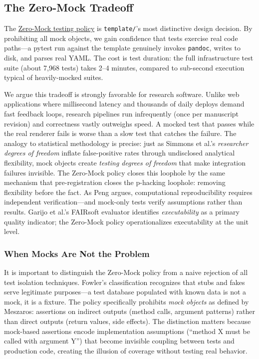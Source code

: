 \documentclass[
]{article}
\begin{document}
\subsection{The Zero-Mock Tradeoff}\label{the-zero-mock-tradeoff}

The \href{03e_quality.md\#zero-mock-testing-policy}{Zero-Mock testing
policy} is \texttt{template/}'s most distinctive design decision. By
prohibiting all mock objects, we gain confidence that tests exercise
real code paths---a pytest run against the template genuinely invokes
\texttt{pandoc}, writes to disk, and parses real YAML. The cost is test
duration: the full infrastructure test suite (about 7,968
tests) takes 2--4 minutes, compared to sub-second execution typical of
heavily-mocked suites.

We argue this tradeoff is strongly favorable for research software.
Unlike web applications where millisecond latency and thousands of daily
deploys demand fast feedback loops, research pipelines run infrequently
(once per manuscript revision) and correctness vastly outweighs speed. A
mocked test that passes while the real renderer fails is worse than a
slow test that catches the failure. The analogy to statistical
methodology is precise: just as Simmons et al.'s \emph{researcher
degrees of freedom} \citep{simmons2011falsepositive} inflate
false-positive rates through undisclosed analytical flexibility, mock
objects create \emph{testing degrees of freedom} that make integration
failures invisible. The Zero-Mock policy closes this loophole by the
same mechanism that pre-registration \citep{nosek2018preregistration}
closes the p-hacking loophole: removing flexibility before the fact. As
Peng \citep{peng2011reproducible} argues, computational reproducibility
requires independent verification---and mock-only tests verify
assumptions rather than results. Garijo et al.'s FAIRsoft evaluator
\citep{garijo2024fairsoft} identifies \emph{executability} as a primary
quality indicator; the Zero-Mock policy operationalizes executability at
the unit level.

\subsubsection{When Mocks Are Not the
Problem}\label{when-mocks-are-not-the-problem}

It is important to distinguish the Zero-Mock policy from a naive
rejection of all test isolation techniques. Fowler's classification
\citep{martin2008clean} recognizes that stubs and fakes serve legitimate
purposes---a test database populated with known data is not a mock, it
is a fixture. The policy specifically prohibits \emph{mock objects} as
defined by Meszaros: assertions on indirect outputs (method calls,
argument patterns) rather than direct outputs (return values, side
effects). The distinction matters because mock-based assertions encode
implementation assumptions (``method X must be called with argument Y'')
that become invisible coupling between tests and production code,
creating the illusion of coverage without testing real behavior.
\end{document}
